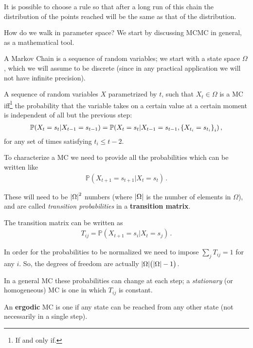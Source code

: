 \documentclass[main.tex]{subfiles}
\begin{document}
It is possible to choose a rule so that after a long run of this chain the distribution of the points reached will be the same as that of the distribution. 

How do we walk in parameter space?
We start by discussing MCMC in general, as a mathematical tool.

A Markov Chain is a sequence of random variables; 
we start with a state space \(\Omega \), which we will assume to be discrete (since in any practical application we will not have infinite precision).

A sequence of random variables \(X\) parametrized by \(t\), such that \(X_t \in \Omega \) is a MC iff\footnote{If and only if.} the probability that the variable takes on a certain value at a certain moment is independent of all but the previous step:
%
\begin{align}
\mathbb{P}(X_t = s_t | X_{t-1} = s_{t-1})
= \mathbb{P}(X_t = s_t |X_{t-1} = s_{t-1}, \qty{ X_{t_i} = s_{t_i}}_i)
\,,
\end{align}
%
for any set of times satisfying \(t_i \leq t-2\). 

To characterize a MC we need to provide all the probabilities which can be written like 
%
\begin{align}
\mathbb{P}(X_{t+1} = s_{t+1} | X_t = s_t)
\,.
\end{align}

These will need to be \(\abs{\Omega }^2\) numbers (where \(\abs{\Omega }\) is the number of elements in \(\Omega \)), and are called \emph{transition probabilities} in a \textbf{transition matrix}. 

The transition matrix can be written as 
%
\begin{align}
T_{ij} = \mathbb{P}(X_{t+1} = s_i | X_{t} = s_j)
\,.
\end{align}

In order for the probabilities to be normalized we need to impose \(\sum_j T_{ij} = 1\) for any \(i\).
So, the degrees of freedom are actually \(\abs{ \Omega } \qty(\abs{\Omega }-1)\).

In a general MC these probabilities can change at each step; a \emph{stationary} (or homogeneous) MC is one in which \(T_{ij}\) is constant. 

An \textbf{ergodic} MC is one if any state can be reached from any other state (not necessarily in a single step). 
\end{document}

